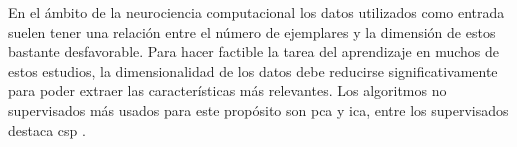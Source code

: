 En el ámbito de la neurociencia computacional los datos utilizados como entrada suelen tener una relación entre el número de ejemplares y la dimensión de estos bastante desfavorable. Para hacer factible la tarea del aprendizaje en muchos de estos estudios, la dimensionalidad de los datos debe reducirse significativamente para poder extraer las características más relevantes. Los algoritmos no supervisados más usados para este propósito son \gls{pca} y \gls{ica}, entre los supervisados destaca \gls{csp} \cite{Lemm2011IntroductionImaging}.

